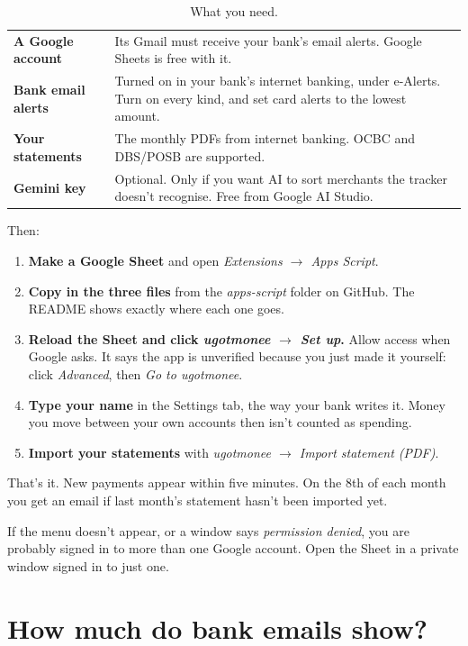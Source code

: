 \documentclass[10pt]{article}
\begin{document}
\begin{table}[H]
\centering
\begin{tabularx}{\linewidth}{@{}>{\bfseries}p{3.4cm}L@{}}
\toprule
A Google account & Its Gmail must receive your bank's email alerts. Google Sheets is free with it. \\
Bank email alerts & Turned on in your bank's internet banking, under e-Alerts. Turn on every kind, and set card alerts to the lowest amount. \\
Your statements & The monthly PDFs from internet banking. OCBC and DBS/POSB are supported. \\
Gemini key & Optional. Only if you want AI to sort merchants the tracker doesn't recognise. Free from Google AI Studio. \\
\bottomrule
\end{tabularx}
\caption{What you need.}
\label{tab:need}
\end{table}

Then:
\begin{enumerate}
  \item \textbf{Make a Google Sheet} and open \emph{Extensions $\rightarrow$ Apps Script}.
  \item \textbf{Copy in the three files} from the \emph{apps-script} folder on GitHub. The README shows exactly where each one goes.
  \item \textbf{Reload the Sheet and click \emph{ugotmonee $\rightarrow$ Set up}.} Allow access when Google asks. It says the app is unverified because you just made it yourself: click \emph{Advanced}, then \emph{Go to ugotmonee}.
  \item \textbf{Type your name} in the Settings tab, the way your bank writes it. Money you move between your own accounts then isn't counted as spending.
  \item \textbf{Import your statements} with \emph{ugotmonee $\rightarrow$ Import statement (PDF)}.
\end{enumerate}

That's it. New payments appear within five minutes. On the 8th of each month you get an email if last month's statement hasn't been imported yet.

If the menu doesn't appear, or a window says \emph{permission denied}, you are probably signed in to more than one Google account. Open the Sheet in a private window signed in to just one.

\section{How much do bank emails show?}
\end{document}
